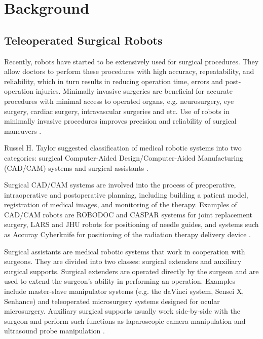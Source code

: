 \chapter{Background}
\label{back}

\section{Teleoperated Surgical Robots}
\label{sec:daVinci}
Recently, robots have started to be extensively used for surgical procedures. They allow doctors to perform these procedures with high accuracy, repeatability, and reliability, which in turn results in reducing operation time, errors and post-operation injuries. Minimally invasive surgeries are beneficial for accurate procedures with minimal access to operated organs, e.g. neurosurgery, eye surgery, cardiac surgery, intravascular surgeries and etc.  Use of robots in minimally invasive procedures improves precision and reliability of surgical maneuvers \cite{tavakoli_haptics_2008}.

Russel H. Taylor suggested classification of medical robotic systems into two categories: surgical Computer-Aided Design/Computer-Aided Manufacturing (CAD/CAM) systems and surgical assistants \cite{taylor_medical_2003}.

Surgical CAD/CAM systems are involved into the process of preoperative, intraoperative and postoperative planning, including building a patient model, registration of medical images, and monitoring of the therapy. Examples of CAD/CAM robots are ROBODOC and CASPAR systems for joint replacement surgery, LARS and JHU robots for positioning of needle guides, and systems such as Accuray Cyberknife for positioning of the radiation therapy delivery device \cite{taylor_medical_2003}. 

Surgical assistants are medical robotic systems that work in cooperation with surgeons. They are divided into two classes: surgical extenders and auxiliary surgical supports. Surgical extenders are operated directly by the surgeon and are used to extend the surgeon's ability in performing an operation. Examples include master-slave manipulator systems (e.g. the daVinci system, Sensei X, Senhance) and teleoperated microsurgery systems designed for ocular microsurgery.  Auxiliary surgical supports usually work side-by-side with the surgeon and perform such functions as laparoscopic camera manipulation and ultrasound probe manipulation \cite{taylor_medical_2003}. 


